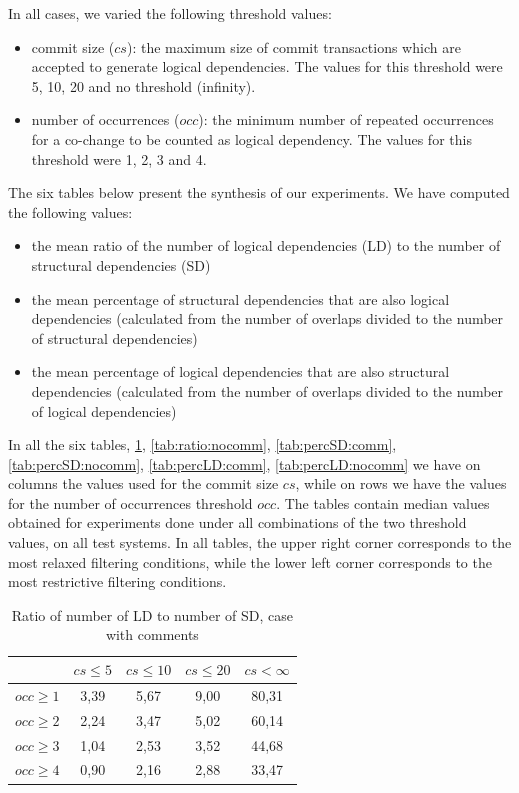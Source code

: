 \documentclass[12pt]{mitthesis}
\begin{document}
In all cases, we varied the following threshold values: 
 \begin{itemize}
	\item commit size ($cs$): the maximum size of commit transactions which are accepted to generate logical dependencies. The values for this threshold were 5, 10, 20 and no threshold (infinity).  
	\item number of occurrences ($occ$): the minimum number of repeated occurrences for a co-change to be counted as logical dependency. The values for this threshold were 1, 2, 3 and 4.  
\end{itemize}

The six tables below present the synthesis of our experiments. 
We have computed the following  values:
\begin{itemize}
	\item the mean ratio of the number of logical dependencies  (LD) to the number of structural dependencies (SD)
   \item the mean percentage of structural dependencies that are also logical dependencies (calculated from the number of overlaps divided to the number of structural dependencies)	
		\item the mean percentage of logical dependencies that are also structural dependencies (calculated from the number of overlaps divided to the number of logical dependencies)
\end{itemize}

In all the six tables, \ref{tab:ratio:comm}, \ref{tab:ratio:nocomm}, \ref{tab:percSD:comm}, \ref{tab:percSD:nocomm},
\ref{tab:percLD:comm}, \ref{tab:percLD:nocomm} we have on columns the values used for the commit size $cs$, while on rows we have the values for the number of occurrences threshold $occ$. The tables contain median values obtained for experiments done under all combinations of the two threshold values, on all test systems. In all tables, the upper right corner corresponds to the most relaxed filtering conditions, while the lower left corner corresponds to the most restrictive filtering conditions.

\begin{table}[!h]
\renewcommand{\arraystretch}{1}
\caption{Ratio of number of LD to number of SD, case with comments}
\label{tab:ratio:comm}
\centering

\begin{tabular}{|c|c|c|c|c|}
\hline
	      &	$cs\leq 5$	&	$cs\leq 10$	&	$cs\leq 20$	&	$cs<\infty$	\\
\hline
$occ\geq 1$	&	3,39	&	5,67	&	9,00	&	80,31	\\
$occ\geq 2$	&	2,24	&	3,47	&	5,02	&	60,14	\\
$occ\geq 3$	&	1,04	&	2,53	&	3,52	&	44,68	\\
$occ\geq 4$	&	0,90	&	2,16	&	2,88	&	33,47	\\
\hline
\end{tabular}
\end{table}
\end{document}
